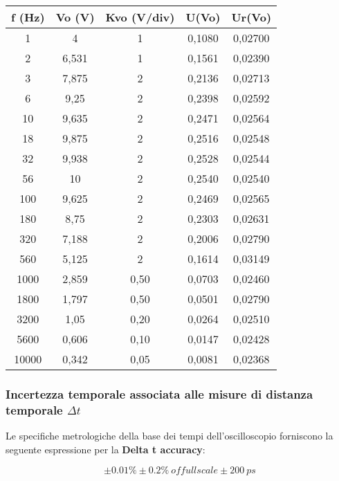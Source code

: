 \begin{table}[!ht]
    \centering
    \begin{tabular}{|c|c|c|c|c|}
    \hline
        \textbf{f (Hz)} & \textbf{Vo (V)} & \textbf{Kvo (V/div)} & \textbf{U(Vo)} & \textbf{Ur(Vo)} \\ \hline
        1 & 4 & 1 & 0,1080 & 0,02700 \\ \hline
        2 & 6,531 & 1 & 0,1561 & 0,02390 \\ \hline
        3 & 7,875 & 2 & 0,2136 & 0,02713 \\ \hline
        6 & 9,25 & 2 & 0,2398 & 0,02592 \\ \hline
        10 & 9,635 & 2 & 0,2471 & 0,02564 \\ \hline
        18 & 9,875 & 2 & 0,2516 & 0,02548 \\ \hline
        32 & 9,938 & 2 & 0,2528 & 0,02544 \\ \hline
        56 & 10 & 2 & 0,2540 & 0,02540 \\ \hline
        100 & 9,625 & 2 & 0,2469 & 0,02565 \\ \hline
        180 & 8,75 & 2 & 0,2303 & 0,02631 \\ \hline
        320 & 7,188 & 2 & 0,2006 & 0,02790 \\ \hline
        560 & 5,125 & 2 & 0,1614 & 0,03149 \\ \hline
        1000 & 2,859 & 0,50 & 0,0703 & 0,02460 \\ \hline
        1800 & 1,797 & 0,50 & 0,0501 & 0,02790 \\ \hline
        3200 & 1,05 & 0,20 & 0,0264 & 0,02510 \\ \hline
        5600 & 0,606 & 0,10 & 0,0147 & 0,02428 \\ \hline
        10000 & 0,342 & 0,05 & 0,0081 & 0,02368 \\ \hline
    \end{tabular}
\end{table}

\FloatBarrier
\clearpage

\subsubsection*{Incertezza temporale associata alle misure di distanza temporale $\Delta t$}
Le specifiche metrologiche della base dei tempi dell'oscilloscopio forniscono la seguente espressione per la \textbf{Delta t accuracy}:

\[\pm0.01\% \pm0.2\% \ of full scale \pm 200 \ ps\]

